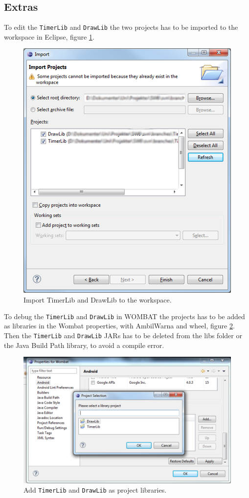 \subsection*{Extras}
To edit the \texttt{TimerLib} and \texttt{DrawLib} the two projects has to be imported to the workspace in Eclipse, figure \ref{fig:import2}.

\begin{figure}[H]
	\centering
		\includegraphics[scale=0.22]{Images/how_to_wombat/import2.png}
	\caption{Import TimerLib and DrawLib to the workspace.}
	\label{fig:import2}
\end{figure}

To debug the \texttt{TimerLib} and \texttt{DrawLib} in WOMBAT the projects has to be added as libraries in the Wombat properties, with AmbilWarna and wheel, figure \ref{fig:add_timer_draw_lib}.
Then the \texttt{TimerLib} and \texttt{DrawLib} JARs has to be deleted from the libs folder or the Java Build Path library, to avoid a compile error.

\begin{figure}[H]
	\centering
		\includegraphics[scale=0.2]{Images/how_to_wombat/add_timer_draw_lib.png}
	\caption{Add \texttt{TimerLib} and \texttt{DrawLib} as project libraries.}
	\label{fig:add_timer_draw_lib}
\end{figure}